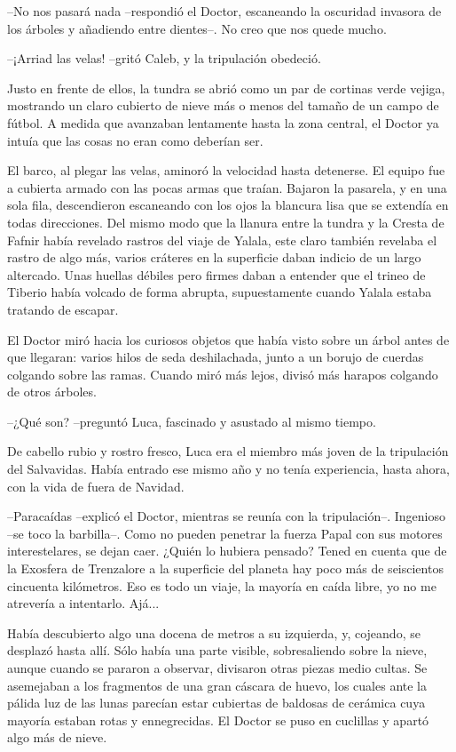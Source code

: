--No nos pasará nada --respondió el Doctor, escaneando la oscuridad invasora de los árboles y añadiendo entre dientes--. No creo que nos quede mucho.
 
--¡Arriad las velas! --gritó Caleb, y la tripulación obedeció.
 
Justo en frente de ellos, la tundra se abrió como un par de cortinas verde vejiga, mostrando un claro cubierto de nieve más o menos del tamaño de un campo de fútbol. A medida que avanzaban lentamente hasta la zona central, el Doctor ya intuía que las cosas no eran como deberían ser.
 
El barco, al plegar las velas, aminoró la velocidad hasta detenerse. El equipo fue a cubierta armado con las pocas armas que traían. Bajaron la pasarela, y en una sola fila, descendieron escaneando con los ojos la blancura lisa que se extendía en todas direcciones. Del mismo modo que la llanura entre la tundra y la Cresta de Fafnir había revelado rastros del viaje de Yalala, este claro también revelaba el rastro de algo más, varios cráteres en la superficie daban indicio de un largo altercado. Unas huellas débiles pero firmes daban a entender que el trineo de Tiberio había volcado de forma abrupta, supuestamente cuando Yalala estaba tratando de escapar.
 
El Doctor miró hacia los curiosos objetos que había visto sobre un árbol antes de que llegaran: varios hilos de seda deshilachada, junto a un borujo de cuerdas colgando sobre las ramas. Cuando miró más lejos, divisó más harapos colgando de otros árboles.
 
--¿Qué son? --preguntó Luca, fascinado y asustado al mismo tiempo.
 
De cabello rubio y rostro fresco, Luca era el miembro más joven de la tripulación del Salvavidas. Había entrado ese mismo año y no tenía experiencia, hasta ahora, con la vida de fuera de Navidad.
 
--Paracaídas --explicó el Doctor, mientras se reunía con la tripulación--. Ingenioso --se toco la barbilla--. Como no pueden penetrar la fuerza Papal con sus motores interestelares, se dejan caer. ¿Quién lo hubiera pensado? Tened en cuenta que de la Exosfera de Trenzalore a la superficie del planeta hay poco más de seiscientos cincuenta kilómetros. Eso es todo un viaje, la mayoría en caída libre, yo no me atrevería a intentarlo. Ajá...
 
Había descubierto algo una docena de metros a su izquierda, y, cojeando, se desplazó hasta allí. Sólo había una parte visible, sobresaliendo sobre la nieve, aunque cuando se pararon a observar, divisaron otras piezas medio cultas. Se asemejaban a los fragmentos de una gran cáscara de huevo, los cuales ante la pálida luz de las lunas parecían estar cubiertas de baldosas de cerámica cuya mayoría estaban rotas y ennegrecidas. El Doctor se puso en cuclillas y apartó algo más de nieve.
 
